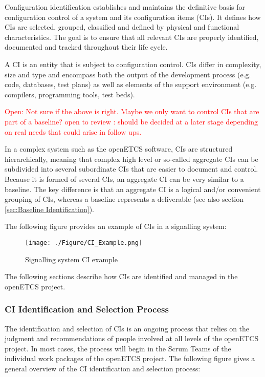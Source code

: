 \documentclass{template/openetcs_report}
\begin{document}
Configuration identification establishes and maintains the definitive basis for configuration control of a system and its configuration items (CIs). It defines how CIs are selected, grouped, classified and defined by physical and functional characteristics. The goal is to ensure that all relevant CIs are properly identified, documented and tracked throughout their life cycle.

A CI is an entity that is subject to configuration control. CIs differ in complexity, size and type and encompass both the output of the development process (e.g. code, databases, test plans) as well as elements of the support environment (e.g. compilers, programming tools, test beds).

\textcolor{red}{Open: Not sure if the above is right. Maybe we only want to control CIs that are part of a baseline? open to review : should be decided at a later stage depending on real needs that could arise in follow ups.}

In a complex system such as the openETCS software, CIs are structured hierarchically, meaning that complex high level or so-called aggregate CIs can be subdivided into several subordinate CIs that are easier to document and control. Because it is formed of several CIs, an aggregate CI can be very similar to a baseline. The key difference is that an aggregate CI is a logical and/or convenient grouping of CIs, whereas a baseline represents a deliverable (see also section \ref{sec:Baseline Identification}).

The following figure provides an example of CIs in a signalling system:

\begin{figure}[H]
\centering
\caption{Signalling system CI example}
\texttt{[image: ./Figure/CI\_Example.png]}
\end{figure}

The following sections describe how CIs are identified and managed in the openETCS project.


\subsubsection{CI Identification and Selection Process} %
\label{sec:CI Identification and Selection Process}

The identification and selection of CIs is an ongoing process that relies on the judgment and recommendations of people involved at all levels of the openETCS project. In most cases, the process will begin in the Scrum Teams of the individual work packages of the openETCS project.
The following figure gives a general overview of the CI identification and selection process:
\end{document}
